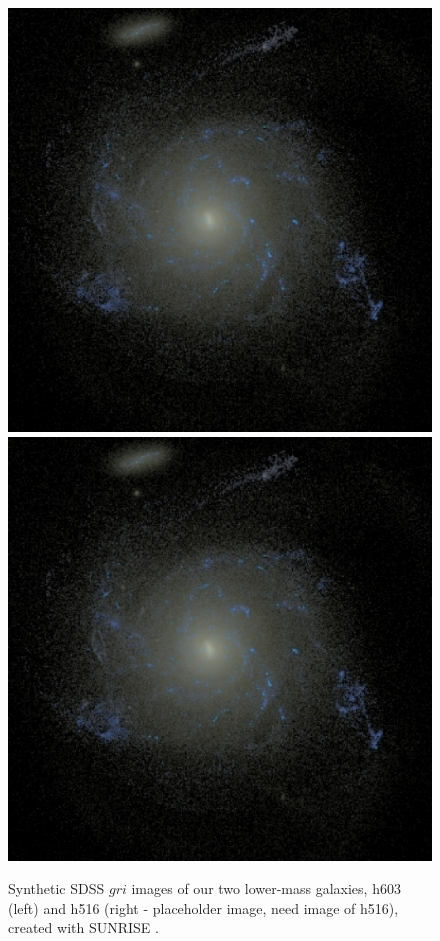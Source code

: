 \documentclass[nofootinbib,twocolumn,prd]{emulateapj}
\begin{document}
\begin{figure}
\includegraphics[width=\columnwidth]{Figures/dwarf1}
\includegraphics[width=\columnwidth]{Figures/dwarf1}
\caption{\label{fig:GalaxyImages}Synthetic SDSS $gri$ images of our two lower-mass galaxies, h603 (left) and h516 (right - placeholder image, need image of h516), created with \textsc{SUNRISE} \citep{Jonsson06}.
\label{fig:images}
}
\end{figure}
\end{document}
